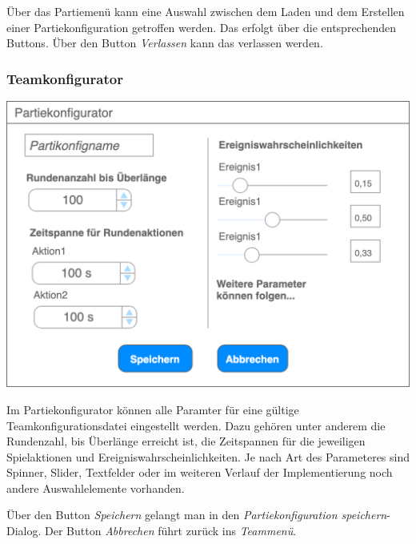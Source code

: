 \documentclass[a4paper,12pt,
headsepline,           %
oneside,               %
pointlessnumbers,      %
bibtotoc,              %
]{scrartcl}
\begin{document}
	Über das Partiemenü kann eine Auswahl zwischen dem Laden und dem Erstellen einer Partiekonfiguration getroffen werden. Das erfolgt über die entsprechenden Buttons. Über den Button \textit{Verlassen} kann das  verlassen werden.
	
	\subsubsection{Teamkonfigurator}
	
	\includegraphics[scale=0.4]{images/partiekonfigurator}
	
	Im Partiekonfigurator können alle Paramter für eine gültige Teamkonfigurationsdatei eingestellt werden. Dazu gehören unter anderem die Rundenzahl, bis Überlänge erreicht ist, die Zeitspannen für die jeweiligen Spielaktionen und Ereigniswahrscheinlichkeiten. Je nach Art des Parameteres sind Spinner, Slider, Textfelder oder im weiteren Verlauf der Implementierung noch andere Auswahlelemente vorhanden.
	
	Über den Button \textit{Speichern} gelangt man in den \textit{Partiekonfiguration speichern}-Dialog. Der Button \textit{Abbrechen} führt zurück ins \textit{Teammenü}.
	
   
\end{document}
